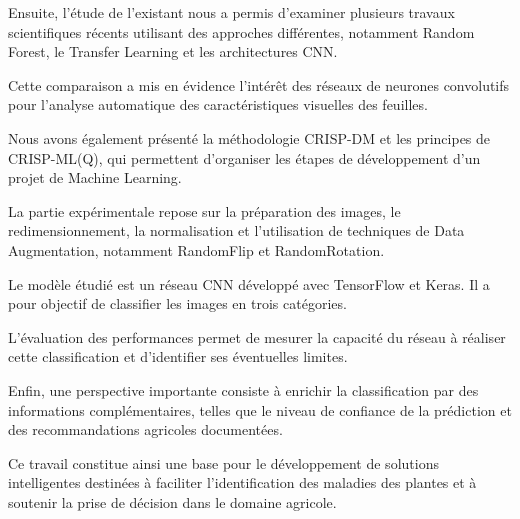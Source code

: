 \documentclass[12pt,a4paper,oneside]{report}
\begin{document}
Ensuite, l'étude de l'existant nous a permis d'examiner
plusieurs travaux scientifiques récents utilisant
des approches différentes, notamment Random Forest,
le Transfer Learning et les architectures CNN.

Cette comparaison a mis en évidence l'intérêt des
réseaux de neurones convolutifs pour l'analyse automatique
des caractéristiques visuelles des feuilles.

Nous avons également présenté la méthodologie CRISP-DM
et les principes de CRISP-ML(Q), qui permettent
d'organiser les étapes de développement d'un projet
de Machine Learning.

La partie expérimentale repose sur la préparation
des images, le redimensionnement, la normalisation
et l'utilisation de techniques de Data Augmentation,
notamment RandomFlip et RandomRotation.

Le modèle étudié est un réseau CNN développé avec
TensorFlow et Keras. Il a pour objectif de classifier
les images en trois catégories.

L'évaluation des performances permet de mesurer
la capacité du réseau à réaliser cette classification
et d'identifier ses éventuelles limites.

Enfin, une perspective importante consiste à enrichir
la classification par des informations complémentaires,
telles que le niveau de confiance de la prédiction
et des recommandations agricoles documentées.

Ce travail constitue ainsi une base pour le développement
de solutions intelligentes destinées à faciliter
l'identification des maladies des plantes et à soutenir
la prise de décision dans le domaine agricole.

\end{document}
